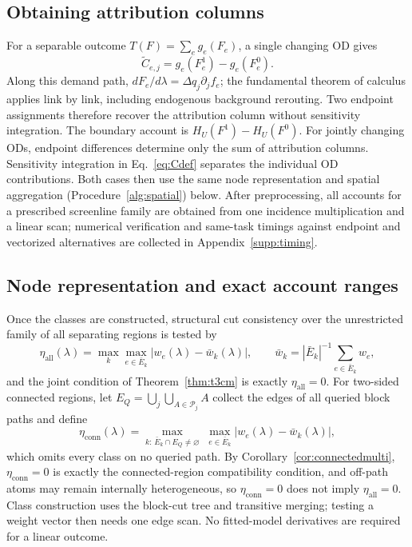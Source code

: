 \documentclass[a4paper,fleqn]{cas-sc}
\begin{document}
\subsection{Obtaining attribution columns}
For a separable outcome $T(F)=\sum_e g_e(F_e)$, a single changing OD gives
\begin{equation}
\widetilde C_{e,j}=g_e(F_e^1)-g_e(F_e^0).
\label{eq:edgeidentity}
\end{equation}
Along this demand path, $dF_e/d\lambda=\Delta q_j\partial_jf_e$; the fundamental theorem of calculus applies link by link, including endogenous background rerouting. Two endpoint assignments therefore recover the attribution column without sensitivity integration. The boundary account is $H_U(F^1)-H_U(F^0)$.
For jointly changing ODs, endpoint differences determine only the sum of attribution columns. Sensitivity integration in Eq.~\eqref{eq:Cdef} separates the individual OD contributions. Both cases then use the same node representation and spatial aggregation (Procedure~\ref{alg:spatial}) below. After preprocessing, all accounts for a prescribed screenline family are obtained from one incidence multiplication and a linear scan; numerical verification and same-task timings against endpoint and vectorized alternatives are collected in Appendix~\ref{supp:timing}.
\subsection{Node representation and exact account ranges}
Once the classes are constructed, structural cut consistency over the
unrestricted family of all separating regions is tested by
\begin{equation}
\eta_{\mathrm{all}}(\lambda)=\max_k\max_{e\in\bar E_k}|w_e(\lambda)-\bar w_k(\lambda)|,
\qquad
\bar w_k=|\bar E_k|^{-1}\sum_{e\in\bar E_k}w_e,
\label{eq:etaall}
\end{equation}
and the joint condition of Theorem~\ref{thm:t3cm} is exactly
$\eta_{\mathrm{all}}=0$. For two-sided connected regions, let
$E_Q=\bigcup_j\bigcup_{A\in\mathcal P_j}A$ collect the edges of all queried
block paths and define
\begin{equation}
\eta_{\mathrm{conn}}(\lambda)=
\max_{k:\,\bar E_k\cap E_Q\neq\varnothing}\;
\max_{e\in\bar E_k}|w_e(\lambda)-\bar w_k(\lambda)|,
\label{eq:etaconn}
\end{equation}
which omits every class on no queried path. By
Corollary~\ref{cor:connectedmulti}, $\eta_{\mathrm{conn}}=0$ is exactly the
connected-region compatibility condition, and off-path atoms may remain
internally heterogeneous, so $\eta_{\mathrm{conn}}=0$ does not imply
$\eta_{\mathrm{all}}=0$. Class construction uses the
block-cut tree and transitive merging; testing a weight vector then needs
one edge scan. No fitted-model derivatives are required for a linear outcome.
\end{document}
